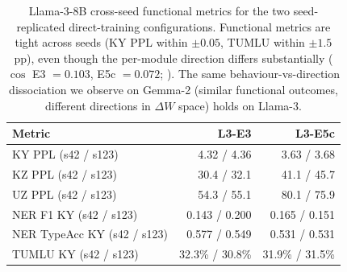 \documentclass[11pt]{article}
\begin{document}
\begin{table}[h]
\centering
\small
\begin{tabular}{lrr}
\toprule
\textbf{Metric} & \textbf{L3-E3} & \textbf{L3-E5c} \\
\midrule
KY PPL (s42 / s123)        & 4.32 / 4.36 & 3.63 / 3.68 \\
KZ PPL (s42 / s123)        & 30.4 / 32.1 & 41.1 / 45.7 \\
UZ PPL (s42 / s123)        & 54.3 / 55.1 & 80.1 / 75.9 \\
NER F1 KY (s42 / s123)     & 0.143 / 0.200 & 0.165 / 0.151 \\
NER TypeAcc KY (s42 / s123)& 0.577 / 0.549 & 0.531 / 0.531 \\
TUMLU KY (s42 / s123)      & 32.3\% / 30.8\% & 31.9\% / 31.5\% \\
\bottomrule
\end{tabular}
\caption{Llama-3-8B cross-seed functional metrics for the two seed-replicated direct-training configurations. Functional metrics are tight across seeds (KY PPL within $\pm 0.05$, TUMLU within $\pm 1.5$ pp), even though the per-module direction differs substantially ($\cos$ E3 $=0.103$, E5c $=0.072$; ). The same behaviour-vs-direction dissociation we observe on Gemma-2 (similar functional outcomes, different directions in $\Delta W$ space) holds on Llama-3.}
\label{tab:llama3_seed}
\end{table}
\end{document}
